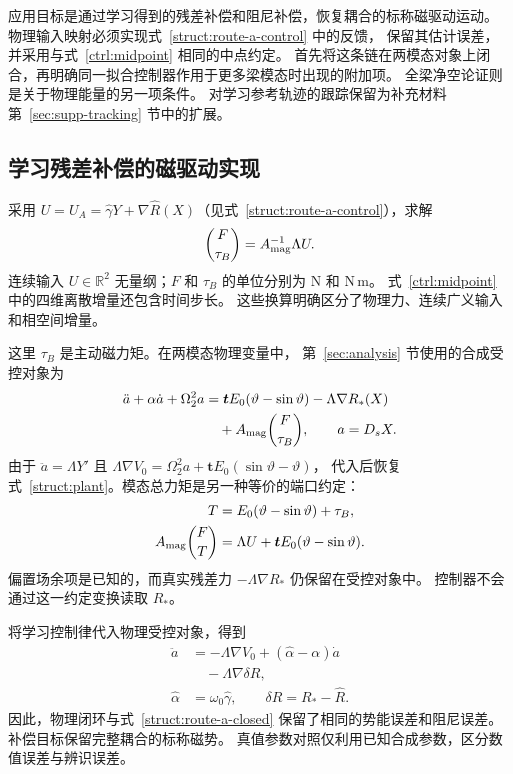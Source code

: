 应用目标是通过学习得到的残差补偿和阻尼补偿，恢复耦合的标称磁驱动运动。
物理输入映射必须实现式~\eqref{struct:route-a-control} 中的反馈，
保留其估计误差，并采用与式~\eqref{ctrl:midpoint} 相同的中点约定。
首先将这条链在两模态对象上闭合，再明确同一拟合控制器作用于更多梁模态时出现的附加项。
全梁净空论证则是关于物理能量的另一项条件。
对学习参考轨迹的跟踪保留为补充材料第~\ref{sec:supp-tracking} 节中的扩展。

\subsection{学习残差补偿的磁驱动实现}
\label{app:ports}
采用 $U=U_A=\widehat\gamma Y+\nabla\widehat R(X)$（见式~\eqref{struct:route-a-control}），求解
\begin{equation}
 \binom{F}{\tau_B}=A_{\rm mag}^{-1}\Lambda U.
 \label{app:port-inverse}
\end{equation}
连续输入 $U\in\mathbb R^2$ 无量纲；$F$ 和 $\tau_B$ 的单位分别为 N 和 N\,m。
式~\eqref{ctrl:midpoint} 中的四维离散增量还包含时间步长。
这些换算明确区分了物理力、连续广义输入和相空间增量。

这里 $\tau_B$ 是主动磁力矩。在两模态物理变量中，
第~\ref{sec:analysis} 节使用的合成受控对象为
\begin{align}
 \ddot a+\alpha\dot a+\Omega_2^2a
 &=\boldsymbol t E_0(\vartheta-\sin\vartheta)
       -\Lambda\nabla R_*(X)\nonumber\\
 &\quad+A_{\rm mag}\binom{F}{\tau_B},
 \qquad a=D_sX.
 \label{app:residual-plant}
\end{align}
由于 $\ddot a=\Lambda Y'$ 且
$\Lambda\nabla V_0=\Omega_2^2a+\boldsymbol tE_0(\sin\vartheta-\vartheta)$，
代入后恢复式~\eqref{struct:plant}。模态总力矩是另一种等价的端口约定：
\begin{align}
 T&=E_0(\vartheta-\sin\vartheta)+\tau_B,\nonumber\\
 A_{\rm mag}\binom{F}{T}
 &=\Lambda U+\boldsymbol tE_0(\vartheta-\sin\vartheta).
 \label{app:total-port}
\end{align}
偏置场余项是已知的，而真实残差力 $-\Lambda\nabla R_*$ 仍保留在受控对象中。
控制器不会通过这一约定变换读取 $R_*$。

将学习控制律代入物理受控对象，得到
\begin{align}
 \ddot a&=-\Lambda\nabla V_0
       +(\widehat\alpha-\alpha)\dot a\nonumber\\
       &\quad-\Lambda\nabla\delta R,\nonumber\\
 \widehat\alpha&=\omega_0\widehat\gamma,\qquad
 \delta R=R_*-\widehat R.
 \label{app:physical-closed-loop}
\end{align}
因此，物理闭环与式~\eqref{struct:route-a-closed} 保留了相同的势能误差和阻尼误差。
补偿目标保留完整耦合的标称磁势。
真值参数对照仅利用已知合成参数，区分数值误差与辨识误差。

